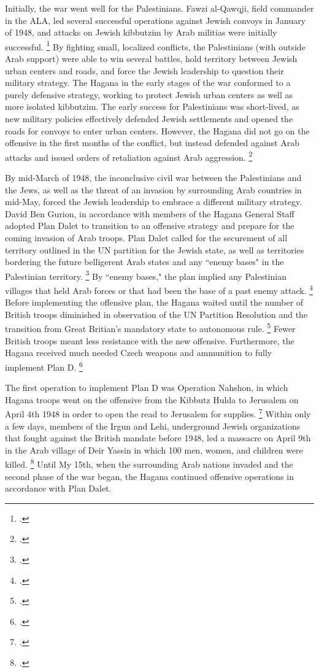 \documentclass[12pt]{turabian-researchpaper}
\begin{document}
Initially, the war went well for the Palestinians.  Fawzi al-Qawqji, field commander in the ALA, led several successful operations against Jewish convoys in January of 1948, and attacks on Jewish kibbutzim by Arab militias were initially successful.
\footcite[][79]{pappe}
By fighting small, localized conflicts, the Palestinians (with outside Arab support) were able to win several battles, hold territory between Jewish urban centers and roads, and force the Jewish leadership to question their military strategy.  The Hagana in the early stages of the war conformed to a purely defensive strategy, working to protect Jewish urban centers as well as more isolated kibbutzim.  The early success for Palestinians was short-lived, as new military policies effectively defended Jewish settlements and opened the roads for convoys to enter urban centers.  However, the Hagana did not go on the offensive in the first months of the conflict, but instead defended against Arab attacks and issued orders of retaliation against Arab aggression.
\footcite[][68]{tal}



By mid-March of 1948, the inconclusive civil war between the Palestinians and the Jews, as well as the threat of an invasion by surrounding Arab countries in mid-May, forced the Jewish leadership to embrace a different military strategy.  David Ben Gurion, in accordance with members of the Hagana General Staff adopted Plan Dalet to transition to an offensive strategy and prepare for the coming invasion of Arab troops.  Plan Dalet called for the securement of all territory outlined in the UN partition for the Jewish state, as well as territories bordering the future belligerent Arab states and any ``enemy bases" in the Palestinian territory.
\footcite{khalidi}
By ``enemy bases," the plan implied any Palestinian villages that held Arab forces or that had been the base of a past enemy attack.
\footcite[][119]{morris}
Before implementing the offensive plan, the Hagana waited until the number of British troops diminished in observation of the UN Partition Resolution and the transition from Great Britian's mandatory state to autonomous rule.
\footcite[][32]{herzog}
Fewer British troops meant less resistance with the new offensive.  Furthermore, the Hagana received much needed Czech weapons and ammunition to fully implement Plan D.
\footcite[][116]{morris}



The first operation to implement Plan D was Operation Nahshon, in which Hagana troops went on the offensive from the Kibbutz Hulda to Jerusalem on April 4th 1948 in order to open the read to Jerusalem for supplies.
\footcite[][121]{morris}
Within only a few days, members of the Irgun and Lehi, underground Jewish organizations that fought against the British mandate before 1948, led a massacre on April 9th in the Arab village of Deir Yassin in which 100 men, women, and children were killed.
\footcite{nabka}
Until My 15th, when the surrounding Arab nations invaded and the second phase of the war began, the Hagana continued offensive operations in accordance with Plan Dalet.
\end{document}
